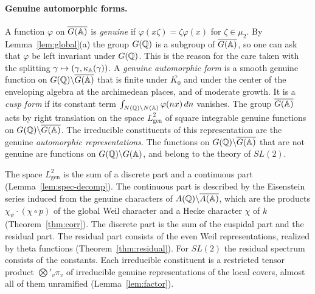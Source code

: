 \paragraph{Genuine automorphic forms.} A function $\varphi$ on
$\overline{G(\mathbb{A})}$ is \emph{genuine} if $\varphi(x\zeta)=\zeta\varphi(x)$
for $\zeta\in\mu_2$. By Lemma~\ref{lem:global}(a) the group $G(\mathbb{Q})$ is a
subgroup of $\overline{G(\mathbb{A})}$, so one can ask that $\varphi$ be left
invariant under $G(\mathbb{Q})$. This is the reason for the care taken with the
splitting $\gamma\mapsto(\gamma,\kappa_{\mathbb{A}}(\gamma))$. A \emph{genuine
automorphic form} is a smooth genuine function on $G(\mathbb{Q})\backslash
\overline{G(\mathbb{A})}$ that is finite under $\overline{K_0}$ and under the
center of the enveloping algebra at the archimedean places, and of
moderate growth. It is a \emph{cusp form} if its constant term
$\int_{N(\mathbb{Q})\backslash N(\mathbb{A})}\varphi(nx)\,dn$ vanishes. The group
$\overline{G(\mathbb{A})}$ acts by right translation on the space
$L^2_{\mathrm{gen}}$ of square integrable genuine functions on
$G(\mathbb{Q})\backslash\overline{G(\mathbb{A})}$. The irreducible constituents of this
representation are the genuine \emph{automorphic representations}. The
functions on $G(\mathbb{Q})\backslash\overline{G(\mathbb{A})}$ that are not genuine are
functions on $G(\mathbb{Q})\backslash G(\mathbb{A})$, and belong to the theory of
$SL(2)$.

The space $L^2_{\mathrm{gen}}$ is the sum of a discrete part and a
continuous part (Lemma~\ref{lem:spec-decomp}). The continuous part is
described by the Eisenstein series induced from the genuine characters
of $A(\mathbb{Q})\backslash\overline{A(\mathbb{A})}$, which are the products
$\chi_\psi\cdot(\chi\circ p)$ of the global Weil character and a Hecke
character $\chi$ of $k$ (Theorem~\ref{thm:corr}). The discrete part is
the sum of the cuspidal part and the residual part. The residual part
consists of the even Weil representations, realized by theta functions
(Theorem~\ref{thm:residual}). For $SL(2)$ the residual spectrum consists
of the constants. Each irreducible constituent is a restricted tensor
product $\bigotimes'_v\pi_v$ of irreducible genuine representations of
the local covers, almost all of them unramified
(Lemma~\ref{lem:factor}).

